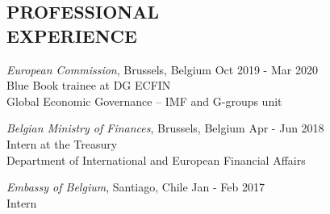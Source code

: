 \documentclass[margin,a4paper]{res}
\begin{document}
\begin{resume}


               
                
                                	

                                	
			                
                
        
                

 
 
  
\section{PROFESSIONAL \\ EXPERIENCE}     

                 {\sl European Commission}, Brussels, Belgium \hfill            Oct 2019 - Mar 2020  \\
                 Blue Book trainee at DG ECFIN \\
		Global Economic Governance -- IMF and G-groups unit

                 {\sl Belgian Ministry of Finances}, Brussels, Belgium \hfill            Apr - Jun 2018 \\
                 Intern at the Treasury \\  %
                 Department of International and European Financial Affairs 

                 {\sl Embassy of Belgium}, Santiago, Chile \hfill            Jan - Feb 2017 \\
                 Intern %
                

\end{resume}
\end{document}
